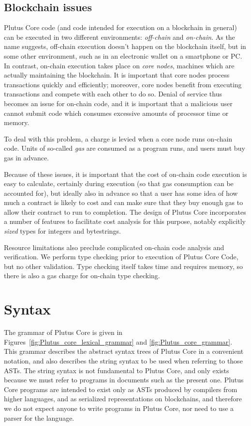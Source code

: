 \documentclass[a4paper]{article}
\begin{document}
\subsection{Blockchain issues}
Plutus Core code (and code intended for execution on a blockchain in
general) can be executed in two different environments:
\textit{off-chain} and \textit{on-chain}.  As the name suggests,
off-chain execution doesn't happen on the blockchain itself, but in
some other environment, such as in an electronic wallet on a
smartphone or PC.  In contrast, on-chain execution takes place on
\textit{core nodes}, machines which are actually maintaining the
blockchain.  It is important that core nodes process transactions
quickly and efficiently; moreover, core nodes benefit from executing
transactions and compete with each other to do so.  Denial of service
thus becomes an issue for on-chain code, and it is important that a
malicious user cannot submit code which consumes excessive amounts of
processor time or memory.

To deal with this problem, a charge is levied when a core node runs
on-chain code.  Units of so-called \textit{gas} are consumed as a
program runs, and users must buy gas in advance.  

Because of these issues, it is important that the cost of on-chain
code execution is easy to calculate, certainly during execution (so
that gas consumption can be accounted for), but ideally also in
advance so that a user has some idea of how much a contract is likely
to cost and can make sure that they buy enough gas to allow their
contract to run to completion.  The design of Plutus Core incorporates
a number of features to facilitate cost analysis for this purpose,
notably explicitly \textit{sized} types for integers and bytestrings.

Resource limitations also preclude complicated on-chain code analysis
and verification.  We perform type checking prior to execution of
Plutus Core Code, but no other validation.  Type checking itself takes
time and requires memory, so there is also a gas charge for on-chain
type checking.

\section{Syntax}

The grammar of Plutus Core is given in
Figures~\ref{fig:Plutus_core_lexical_grammar} and
\ref{fig:Plutus_core_grammar}. This grammar describes the abstract
syntax trees of Plutus Core in a convenient notation, and also
describes the string syntax to be used when referring to those
ASTs. The string syntax is not fundamental to Plutus Core, and only
exists because we must refer to programs in documents such as
the present one. Plutus Core programs are intended to exist only as ASTs produced by
compilers from higher languages, and as serialized representations on
blockchains, and therefore we do not expect anyone to write programs
in Plutus Core, nor need to use a parser for the language.
\end{document}
